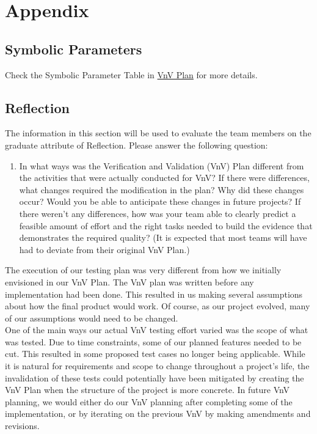 \documentclass[12pt, titlepage]{article}
\begin{document}
\newpage{}
\section*{Appendix}
\subsection{Symbolic Parameters}
Check the Symbolic Parameter Table in \href{https://github.com/beatlepie/4G06CapstoneProjectTeam2/blob/main/docs/VnVPlan/VnVPlan.pdf}{VnV Plan} for more details.

\subsection{Reflection}
The information in this section will be used to evaluate the team members on the
graduate attribute of Reflection.  Please answer the following question:

\begin{enumerate}
  \item In what ways was the Verification and Validation (VnV) Plan different
  from the activities that were actually conducted for VnV?  If there were
  differences, what changes required the modification in the plan?  Why did
  these changes occur?  Would you be able to anticipate these changes in future
  projects?  If there weren't any differences, how was your team able to clearly
  predict a feasible amount of effort and the right tasks needed to build the
  evidence that demonstrates the required quality?  (It is expected that most
  teams will have had to deviate from their original VnV Plan.)
\end{enumerate}

The execution of our testing plan was very different from how we initially envisioned in our VnV Plan. The VnV plan was written before any implementation had been done.
This resulted in us making several assumptions about how the final product would work. Of course, as our project evolved, many of our assumptions would need to be changed.\\

One of the main ways our actual VnV testing effort varied was the scope of what was tested. Due to time constraints, some of our planned features needed to be cut.
This resulted in some proposed test cases no longer being applicable. While it is natural for requirements and scope to change throughout a project's life, the invalidation of these tests
could potentially have been mitigated by creating the VnV Plan when the structure of the project is more concrete. In future VnV planning, we would either do our VnV planning after completing some of the
implementation, or by iterating on the previous VnV by making amendments and revisions.\\
\end{document}
